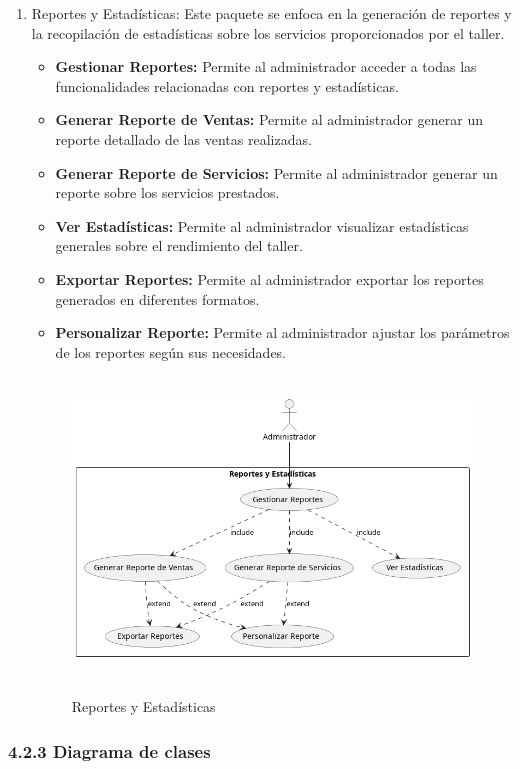 \begin{enumerate}
	\item Reportes y Estadísticas:
	Este paquete se enfoca en la generación de reportes y la recopilación de estadísticas sobre los servicios proporcionados por el taller.
	\begin{itemize}
		\item \textbf{Gestionar Reportes:} Permite al administrador acceder a todas las funcionalidades relacionadas con reportes y estadísticas.
		\item \textbf{Generar Reporte de Ventas:} Permite al administrador generar un reporte detallado de las ventas realizadas.
		\item \textbf{Generar Reporte de Servicios:} Permite al administrador generar un reporte sobre los servicios prestados.
		\item \textbf{Ver Estadísticas:} Permite al administrador visualizar estadísticas generales sobre el rendimiento del taller.
		\item \textbf{Exportar Reportes:} Permite al administrador exportar los reportes generados en diferentes formatos.
		\item \textbf{Personalizar Reporte:} Permite al administrador ajustar los parámetros de los reportes según sus necesidades.
	\end{itemize}  
	\begin{figure}[H]
		\centering
		\caption{Reportes y Estadísticas}
		\includegraphics[width=12cm, height=8cm]{imagenes/cap4/casosUso/ReportesEstadisticas.png}
		\label{fig:Caso7}
	\end{figure}     
\end{enumerate}


\subsubsection*{4.2.3 Diagrama de clases}

